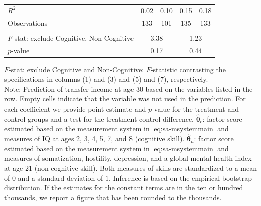 \documentclass[static]{JJH-Beamer}
\begin{document}
\begin{frame}
\begin{table}[H]
\begin{center}
{\begin{tabular}{lcccccccc}
$R^2$ &         \multicolumn{2}{c}{0.02} &         \multicolumn{2}{c}{0.10} &               \multicolumn{2}{c}{0.15} &            \multicolumn{2}{c}{0.18}  \\
Observations &       \multicolumn{2}{c}{133} &           \multicolumn{2}{c}{101} &         \multicolumn{2}{c}{135} &            \multicolumn{2}{c}{133}  \\  \\ \midrule
$F$-stat: exclude Cognitive, Non-Cognitive &              \multicolumn{4}{c}{3.38} &             \multicolumn{4}{c}{1.23}  \\
$p$-value &            \multicolumn{4}{c}{0.17} &               \multicolumn{4}{c}{0.44}  \\
\bottomrule
\end{tabular}
}
\end{center}
\tiny \flushleft
$F$-stat: exclude Cognitive and Non-Cognitive: $F$-statistic contrasting the specifications in columns (1) and (3) and (5) and (7), respectively.\\
Note: Prediction of transfer income at age 30 based on the variables listed in the row. Empty cells indicate that the variable was not used in the prediction. For each coefficient we provide point estimate and $p$-value for the treatment and control groups and a test for the treatment-control difference. $\hat{\bm{\theta}}_{c}$: factor score estimated based on the measurement system in \eqref{eq:sa-msystemmain} and measures of IQ at ages 2, 3, 4, 5, 7, and 8 (cognitive skill). $\hat{\bm{\theta}}_{n}$: factor score estimated based on the measurement system in \eqref{eq:sa-msystemmain} and measures of somatization, hostility, depression, and a global mental health index at age 21 (non-cognitive skill). Both measures of skills are standardized to a mean of $0$ and a standard deviation of $1$. Inference is based on the empirical bootstrap distribution. If the estimates for the constant terms are in the ten or hundred thousands, we report a figure that has been rounded to the thousands.\\
\end{table}

\end{frame}
\end{document}
